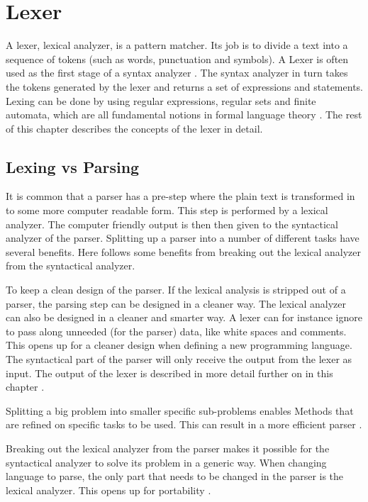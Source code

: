 \chapter{Lexer \label{chap:lexer}}
A lexer, lexical analyzer, is a pattern matcher. Its job is to divide a text
into a sequence of tokens (such as words, punctuation and symbols). A Lexer is
often used as the first stage of a syntax analyzer \cite{sebesta2012}. The syntax
analyzer in turn takes the tokens generated by the lexer and returns a set of
expressions and statements. Lexing can be done by using regular expressions,
regular sets and finite automata, which are all fundamental notions in
formal language theory \cite{Aho1990}. The rest of this chapter describes the
concepts of the lexer in detail.

\section{Lexing vs Parsing}
It is common that a parser has a pre-step where the plain text is transformed
in to some more computer readable form. This step is performed by a lexical
analyzer.
The computer friendly output is then then given to the syntactical analyzer of
the parser. Splitting up a parser into a number of different tasks have several
benefits. Here follows some benefits from breaking out the lexical analyzer from
the syntactical analyzer.

To keep a clean design of the parser. If the lexical analysis is stripped out of
a parser, the parsing step can be designed in a cleaner way. The lexical
analyzer can also be designed in a cleaner and smarter way. A lexer can for
instance ignore to pass along unneeded (for the parser) data, like white spaces
and comments. This opens up for a cleaner design when defining a new programming
language. The syntactical part of the parser will only receive the output from
the lexer as input. The output of the lexer is described in more detail further
on in this chapter \cite{Aho2006}.

\newpage

Splitting a big problem into smaller specific sub-problems enables Methods that
are refined on specific tasks to be used. This can result in a more efficient
parser \cite{Aho2006}.

Breaking out the lexical analyzer from the parser makes it possible for the
syntactical analyzer to solve its problem in a generic way. When changing language
to parse, the only part that needs to be changed in the parser is the lexical
analyzer. This opens up for portability \cite{Aho2006}.

